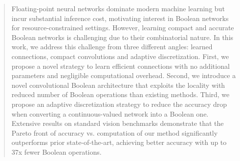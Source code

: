 \begin{abstract}

Floating-point neural networks dominate modern machine learning but incur substantial 
inference cost, motivating interest in Boolean networks for resource-constrained settings. 
However, learning compact and accurate Boolean networks is challenging due to their combinatorial nature. In this work, we address 
this challenge from three different angles: learned connections, 
compact convolutions and adaptive discretization. First, we propose a novel strategy 
to learn efficient connections with no additional parameters and negligible computational overhead. Second, we introduce a novel convolutional Boolean architecture that exploits the locality with reduced number of Boolean operations than existing methods. Third, we propose an adaptive discretization strategy to reduce the accuracy drop when converting a continuous-valued network into a Boolean one. Extensive results on standard vision benchmarks demonstrate that the Pareto front of accuracy vs. computation of our method significantly outperforms prior state-of-the-art, achieving better accuracy with up to 37x fewer Boolean operations.
\end{abstract}
